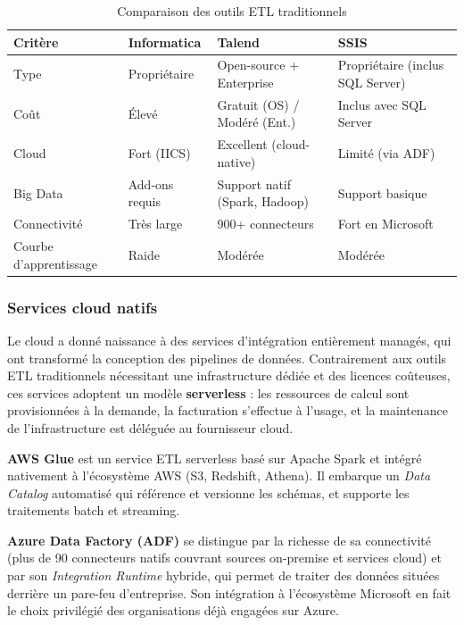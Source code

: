 \begin{table}[htbp]
\centering
\caption{Comparaison des outils ETL traditionnels}
\label{tab:etl-tools-comparison}
\begin{tabularx}{\textwidth}{lXXX}
\toprule
\textbf{Critère} & \textbf{Informatica} & \textbf{Talend} & \textbf{SSIS} \\
\midrule
Type & Propriétaire & Open-source + Enterprise & Propriétaire (inclus SQL Server) \\
\addlinespace
Coût & Élevé & Gratuit (OS) / Modéré (Ent.) & Inclus avec SQL Server \\
\addlinespace
Cloud & Fort (IICS) & Excellent (cloud-native) & Limité (via ADF) \\
\addlinespace
Big Data & Add-ons requis & Support natif (Spark, Hadoop) & Support basique \\
\addlinespace
Connectivité & Très large & 900+ connecteurs & Fort en Microsoft \\
\addlinespace
Courbe d'apprentissage & Raide & Modérée & Modérée \\
\bottomrule
\end{tabularx}
\end{table}

\subsubsection{Services cloud natifs}
\label{subsubsec:cloud-natifs}



Le cloud a donné naissance à des services d'intégration entièrement managés,
qui ont transformé la conception des pipelines de données. Contrairement aux
outils ETL traditionnels nécessitant une infrastructure dédiée et des licences
coûteuses, ces services adoptent un modèle \textbf{serverless} : les ressources
de calcul sont provisionnées à la demande, la facturation s'effectue à l'usage,
et la maintenance de l'infrastructure est déléguée au fournisseur cloud.

\textbf{AWS Glue} est un service ETL serverless basé sur Apache Spark et intégré
nativement à l'écosystème AWS (S3, Redshift, Athena). Il embarque un
\textit{Data Catalog} automatisé qui référence et versionne les schémas, et
supporte les traitements batch et streaming.

\textbf{Azure Data Factory (ADF)} se distingue par la richesse de sa
connectivité (plus de 90 connecteurs natifs couvrant sources on-premise et
services cloud) et par son \textit{Integration Runtime} hybride, qui permet de
traiter des données situées derrière un pare-feu d'entreprise. Son intégration
à l'écosystème Microsoft en fait le choix privilégié des organisations déjà
engagées sur Azure.

